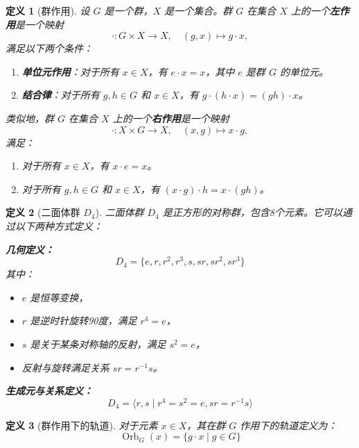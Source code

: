 \documentclass{ctexart}
\newtheorem{definition}{定义}
\DeclareMathOperator{\Orb}{Orb} %
\begin{document}
\begin{definition}[群作用]
    设 \( G \) 是一个群，\( X \) 是一个集合。群 \( G \) 在集合 \( X \) 上的一个\textbf{左作用}是一个映射
    \[
    \cdot \colon G \times X \to X, \quad (g, x) \mapsto g \cdot x,
    \]
    满足以下两个条件：
    \begin{enumerate}
        \item \textbf{单位元作用}：对于所有 \( x \in X \)，有 \( e \cdot x = x \)，其中 \( e \) 是群 \( G \) 的单位元。
        \item \textbf{结合律}：对于所有 \( g, h \in G \) 和 \( x \in X \)，有 \( g \cdot (h \cdot x) = (gh) \cdot x \)。
    \end{enumerate}
    类似地，群 \( G \) 在集合 \( X \) 上的一个\textbf{右作用}是一个映射
    \[
    \cdot \colon X \times G \to X, \quad (x, g) \mapsto x \cdot g,
    \]
    满足：
    \begin{enumerate}
        \item 对于所有 \( x \in X \)，有 \( x \cdot e = x \)。
        \item 对于所有 \( g, h \in G \) 和 \( x \in X \)，有 \( (x \cdot g) \cdot h = x \cdot (gh) \)。
    \end{enumerate}
\end{definition}


\begin{definition}[二面体群 \( D_4 \)]
    二面体群 \( D_4 \) 是正方形的对称群，包含8个元素。它可以通过以下两种方式定义：
    
    \textbf{几何定义：}
    \[
    D_4 = \{ e, r, r^2, r^3, s, sr, sr^2, sr^3 \}
    \]
    其中：
    \begin{itemize}
        \item \( e \) 是恒等变换，
        \item \( r \) 是逆时针旋转90度，满足 \( r^4 = e \)，
        \item \( s \) 是关于某条对称轴的反射，满足 \( s^2 = e \)，
        \item 反射与旋转满足关系 \( sr = r^{-1}s \)。
    \end{itemize}
    
    \textbf{生成元与关系定义：}
    \[
    D_4 = \langle r, s \mid r^4 = s^2 = e, sr = r^{-1}s \rangle
    \]
    \end{definition}

    \begin{definition}[群作用下的轨道]

        对于元素 \( x \in X \)，其在群 \( G \) 作用下的轨道定义为：
        \[
        \Orb_G(x) = \{ g \cdot x \mid g \in G \}
        \]
    \end{definition}
\end{document}
